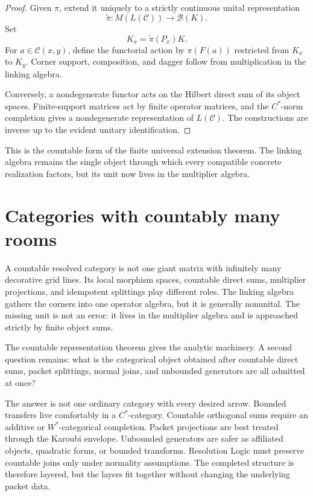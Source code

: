 \documentclass[11pt]{article}
\theoremstyle{definition}
\theoremstyle{remark}
\begin{document}
\begin{proof}
Given $\pi$, extend it uniquely to a strictly continuous unital representation
\[
\widetilde\pi:M(L(\mathcal C))\to\mathcal B(K).
\]
Set
\[
K_x=\widetilde\pi(P_x)K.
\]
For $a\in\mathcal C(x,y)$, define the functorial action by $\pi(F(a))$ restricted from $K_x$ to $K_y$.  Corner support, composition, and dagger follow from multiplication in the linking algebra.

Conversely, a nondegenerate functor acts on the Hilbert direct sum of its object spaces.  Finite-support matrices act by finite operator matrices, and the $C^*$-norm completion gives a nondegenerate representation of $L(\mathcal C)$.  The constructions are inverse up to the evident unitary identification.
\end{proof}

This is the countable form of the finite universal extension theorem.  The linking algebra remains the single object through which every compatible concrete realization factors, but its unit now lives in the multiplier algebra.


\part{Categories with countably many rooms}

A countable resolved category is not one giant matrix with infinitely many decorative grid lines.  Its local morphism spaces, countable direct sums, multiplier projections, and idempotent splittings play different roles.  The linking algebra gathers the corners into one operator algebra, but it is generally nonunital.  The missing unit is not an error: it lives in the multiplier algebra and is approached strictly by finite object sums.

\label{sec:categorical-completion}

The countable representation theorem gives the analytic machinery.  A second question remains: what is the categorical object obtained after countable direct sums, packet splittings, normal joins, and unbounded generators are all admitted at once?

The answer is not one ordinary category with every desired arrow.  Bounded transfers live comfortably in a $C^*$-category.  Countable orthogonal sums require an additive or $W^*$-categorical completion.  Packet projections are best treated through the Karoubi envelope.  Unbounded generators are safer as affiliated objects, quadratic forms, or bounded transforms.  Resolution Logic must preserve countable joins only under normality assumptions.  The completed structure is therefore layered, but the layers fit together without changing the underlying packet data.
\end{document}
